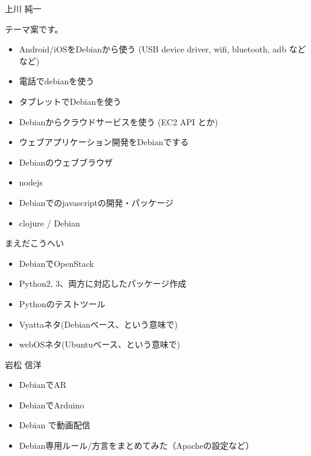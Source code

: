 
\begin{prework}{上川 純一}

テーマ案です。

\begin{itemize}
 \item Android/iOSをDebianから使う (USB device driver, wifi, bluetooth,
       adb などなど)
 \item 電話でdebianを使う
 \item タブレットでDebianを使う
 \item Debianからクラウドサービスを使う (EC2 API とか)
 \item ウェブアプリケーション開発をDebianでする
 \item Debianのウェブブラウザ
 \item nodejs
 \item Debianでのjavascriptの開発・パッケージ
 \item clojure / Debian
\end{itemize}
\end{prework}

\begin{prework}{まえだこうへい}
\begin{itemize}
  \item DebianでOpenStack
  \item Python2, 3、両方に対応したパッケージ作成
  \item Pythonのテストツール
  \item Vyattaネタ(Debianベース、という意味で)
  \item webOSネタ(Ubuntuベース、という意味で)
\end{itemize}
\end{prework}

\begin{prework}{岩松 信洋}
\begin{itemize}
  \item DebianでAR
  \item DebianでArduino
  \item Debian で動画配信
  \item Debian専用ルール/方言をまとめてみた（Apacheの設定など）
\end{itemize}
\end{prework}

